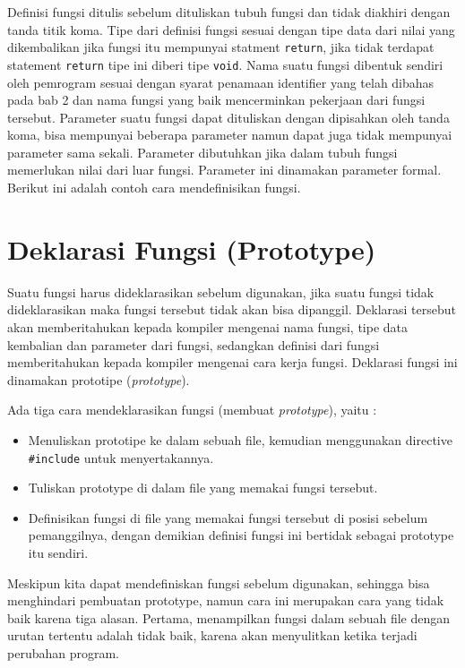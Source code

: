 Definisi fungsi ditulis sebelum dituliskan tubuh fungsi dan tidak
diakhiri dengan tanda titik koma. Tipe dari definisi fungsi sesuai
dengan tipe data dari nilai yang dikembalikan jika fungsi itu mempunyai
statment \texttt{return}, jika tidak terdapat statement \texttt{return}
tipe ini diberi tipe \texttt{void}. Nama suatu fungsi dibentuk sendiri
oleh pemrogram sesuai dengan syarat penamaan identifier yang telah
dibahas pada bab 2 dan nama fungsi yang baik mencerminkan pekerjaan dari
fungsi tersebut. Parameter suatu fungsi dapat dituliskan dengan
dipisahkan oleh tanda koma, bisa mempunyai beberapa parameter namun
dapat juga tidak mempunyai parameter sama sekali. Parameter dibutuhkan
jika dalam tubuh fungsi memerlukan nilai dari luar fungsi. Parameter ini
dinamakan parameter formal. Berikut ini adalah contoh cara
mendefinisikan fungsi.



\section{Deklarasi Fungsi (Prototype)}\label{deklarasi-fungsi-prototype}

Suatu fungsi harus dideklarasikan sebelum digunakan, jika suatu fungsi
tidak dideklarasikan maka fungsi tersebut tidak akan bisa dipanggil.
Deklarasi tersebut akan memberitahukan kepada kompiler mengenai nama
fungsi, tipe data kembalian dan parameter dari fungsi, sedangkan
definisi dari fungsi memberitahukan kepada kompiler mengenai cara kerja
fungsi. Deklarasi fungsi ini dinamakan prototipe (\emph{prototype}).

Ada tiga cara mendeklarasikan fungsi (membuat \emph{prototype}), yaitu :

\begin{itemize}

\item
 Menuliskan prototipe ke dalam sebuah file, kemudian menggunakan
 directive \texttt{\#include} untuk menyertakannya.
\item
 Tuliskan prototype di dalam file yang memakai fungsi tersebut.
\item
 Definisikan fungsi di file yang memakai fungsi tersebut di posisi
 sebelum pemanggilnya, dengan demikian definisi fungsi ini bertidak
 sebagai prototype itu sendiri.
\end{itemize}

Meskipun kita dapat mendefiniskan fungsi sebelum digunakan, sehingga
bisa menghindari pembuatan prototype, namun cara ini merupakan cara yang
tidak baik karena tiga alasan. Pertama, menampilkan fungsi dalam sebuah
file dengan urutan tertentu adalah tidak baik, karena akan menyulitkan
ketika terjadi perubahan program.

